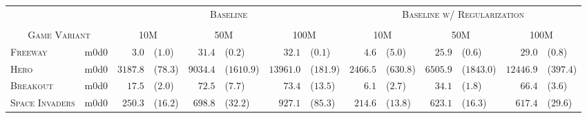\begin{tabular}{ll  rl rl rl rl rl rl}
    \multicolumn{2}{c}{}
    & \multicolumn{6}{c}{\textsc{Baseline}}
    & \multicolumn{6}{c}{\textsc{Baseline w/ Regularization}} \\
    \cmidrule(lr){3-8}\cmidrule(lr){9-14} \cmidrule(lr){11-14} \\

    \multicolumn{2}{c}{\textsc{Game Variant}}
    & \multicolumn{2}{c}{\textsc{10M}}
    & \multicolumn{2}{c}{\textsc{50M}}
    & \multicolumn{2}{c}{\textsc{100M}}

    & \multicolumn{2}{c}{\textsc{10M}}
    & \multicolumn{2}{c}{\textsc{50M}}
    & \multicolumn{2}{c}{\textsc{100M}} \\ \midrule[0.4mm]

\multirow{1}{*}{\textsc{Freeway}}

& m0d0
& $3.0$ & ($1.0$)
& $31.4$ & ($0.2$)
& $32.1$ & ($0.1$)

& $4.6$ & ($5.0$)
& $25.9$ & ($0.6$)
& $29.0$ & ($0.8$) \\ \cmidrule[0.2mm]{1-14}
                                                      

\multirow{1}{*}{\textsc{Hero}}

& m0d0
& $3187.8$ & ($78.3$)
& $9034.4$ & ($1610.9$)
& $13961.0$ & ($181.9$)

& $2466.5$ & ($630.8$)
& $6505.9$ & ($1843.0$)
& $12446.9$ & ($397.4$) \\ \cmidrule[0.2mm]{1-14}

\multirow{1}{*}{\textsc{Breakout}}

& m0d0
& $17.5$ & ($2.0$)
& $72.5$ & ($7.7$)
& $73.4$ & ($13.5$)


& $6.1$ & ($2.7$)
& $34.1$ & ($1.8$)
& $66.4$ & ($3.6$) \\ \cmidrule[0.2mm]{1-14}


\multirow{1}{*}{\textsc{Space Invaders}}

& m0d0
& $250.3$ & ($16.2$)
& $698.8$ & ($32.2$)
& $927.1$ & ($85.3$)

& $214.6$ & ($13.8$)
& $623.1$ & ($16.3$)
& $617.4$ & ($29.6$)

\end{tabular}
